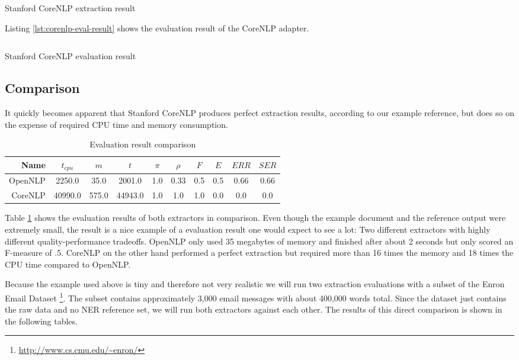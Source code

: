 \begin{listing}[H]
\inputminted{xml}{corenlp.xml}
\caption{Stanford CoreNLP extraction result}
\label{lst:corenlp-result}
\end{listing}

Listing \ref{lst:corenlp-eval-result} shows the evaluation result of the CoreNLP adapter.

\begin{listing}[H]
\inputminted{java}{corenlp.txt}
\caption{Stanford CoreNLP evaluation result}
\label{lst:corenlp-eval-result}
\end{listing}

\subsection{Comparison}
It quickly becomes apparent that Stanford CoreNLP produces perfect extraction results, according to our example reference, but does so on the expense of required CPU time and memory consumption. 

\begin{table}[H]
\centering
\begin{tabular*}{\textwidth}{rccccccccc}
	\toprule
	Name & $t_{cpu}$ & $m$ & $t$ & $\pi$ & $\rho$ & $F$ & $E$ & $ERR$ & $SER$ \\
	\midrule
	OpenNLP & 2250.0 & 35.0 & 2001.0 & 1.0 & 0.33 & 0.5 & 0.5 & 0.66 & 0.66 \\ 
	CoreNLP & 40990.0 & 575.0 & 44943.0 & 1.0 & 1.0 & 1.0 & 0.0 & 0.0 & 0.0 \\
	\bottomrule
\end{tabular*}
\caption{Evaluation result comparison}
\label{tbl:result-comparison}
\end{table}

Table \ref{tbl:result-comparison} shows the evaluation results of both extractors in comparison. Even though the example document and the reference output were extremely small, the result is a nice example of a evaluation result one would expect to see a lot: Two different extractors with highly different quality-performance tradeoffs. OpenNLP only used 35 megabytes of memory and finished after about 2 seconds but only scored an F-measure of .5. CoreNLP on the other hand performed a perfect extraction but required more than 16 times the memory and 18 times the CPU time compared to OpenNLP.

Because the example used above is tiny and therefore not very realistic we will run two extraction evaluations with a subset of the Enron Email Dataset \footnote{\url{http://www.cs.cmu.edu/~enron/}}. The subset contains approximately 3,000 email messages with about 400,000 words total. Since the dataset just contains the raw data and no \gls{NER} reference set, we will run both extractors against each other. The results of this direct comparison is shown in the following tables.


